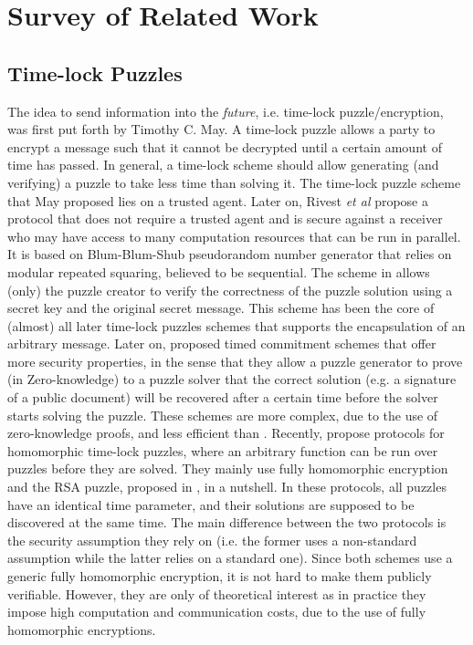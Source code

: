 \section{Survey of Related Work}\label{Survey-of-Related-Work}
\subsection{Time-lock Puzzles}\label{survey-time-lock-puzzle}

The idea to send information into the \emph{future}, i.e.
time-lock puzzle/encryption, was first put forth by Timothy C. May. A time-lock puzzle allows a party to encrypt a message such that it cannot be decrypted  until a certain amount of time has passed. In general,  a  time-lock scheme should allow    generating (and verifying) a puzzle to take less time than solving it. The time-lock puzzle scheme that May proposed lies on a trusted agent. Later on, Rivest \textit{et al} \cite{Rivest:1996:TPT:888615} propose a protocol that does not require a trusted agent and is secure against a receiver
who may have access to many  computation resources that can be run in parallel. It is based on Blum-Blum-Shub pseudorandom number generator that relies on modular repeated squaring, believed to be sequential. The scheme in \cite{Rivest:1996:TPT:888615} allows (only) the puzzle creator to  verify the correctness of the puzzle solution using a secret key and the original secret message.  This scheme has been the core of (almost) all later time-lock puzzles schemes that supports the encapsulation of an arbitrary message. Later on, \cite{BonehN00,DBLP:conf/fc/GarayJ02} proposed timed commitment schemes that offer more security properties, in the sense that they   allow a puzzle generator to prove (in Zero-knowledge) to a puzzle solver that the correct solution (e.g. a signature of a public document) will be recovered after a certain time before the solver starts solving the puzzle. These schemes are more complex, due to the use of zero-knowledge proofs, and less efficient than \cite{Rivest:1996:TPT:888615}.    Recently, \cite{MalavoltaT19,BrakerskiDGM19}  propose protocols for homomorphic time-lock puzzles, where an arbitrary function can be run over puzzles before they are solved. They mainly use  fully homomorphic encryption and   the RSA puzzle, proposed in \cite{BrakerskiDGM19}, in a nutshell. In these protocols, all puzzles have an identical time parameter, and their solutions are supposed to be discovered at the same time. The main difference between the two protocols is the security assumption they rely on (i.e. the former uses a non-standard assumption while the latter relies on a standard one). Since both schemes use a generic fully homomorphic encryption, it is not hard to make them publicly verifiable. However, they  are only of theoretical interest as in practice they impose  high computation and communication costs, due to the use of fully homomorphic encryptions. 


